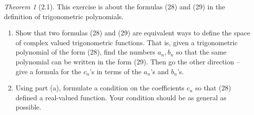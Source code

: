 \documentclass[12pt]{article}
\theoremstyle{remark}
\theoremstyle{named}
\newtheorem*{theorem}{Theorem}
\begin{document}
\begin{theorem}[2.1]
    This exercise is about the formulas (28) and (29) in the definition of trigonometric polynomials.
    \begin{enumerate}
        \item Show that two formulas (28) and (29) are equivalent ways to define the space of complex valued trigonometric functions. That is, given a trigonometric polynomial of the form (28), find the numbers \(a_n, b_n\) so that the same polynomial can be written in the form (29). Then go the other direction -- give a formula for the \(c_n\)'s in terms of the \(a_n\)'s and \(b_n\)'s.
        \item Using part (a), formulate a condition on the coefficients \(c_n\) so that (28) defined a real-valued function. Your condition should be as general as possible.
    \end{enumerate}
\end{theorem}
\end{document}

